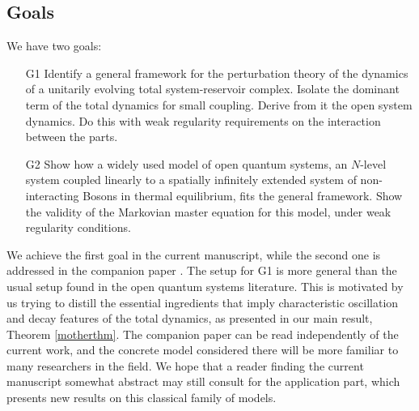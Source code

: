 \documentclass[letterpaper,onecolumn,11pt,accepted=2021-12-09]{quantumarticle}
\numberwithin{equation}{section}
\begin{document}
\subsection{Goals}


We have two goals:
\begin{itemize}
	\item[G1] Identify a general framework for the perturbation theory of the dynamics of a unitarily evolving total system-reservoir complex. Isolate the dominant term of the total dynamics for small coupling. Derive from it the open system dynamics. Do this with weak regularity requirements on the interaction between the parts.
	
	
	\item[G2] Show how a widely used model of open quantum systems, an $N$-level system coupled linearly to a spatially infinitely extended system of non-interacting Bosons in thermal equilibrium, fits the general framework. Show the validity of the Markovian master equation for this model, under weak regularity conditions.  
\end{itemize}


We achieve the first goal in the current manuscript, while the second one is addressed in the companion paper \cite{Markov2}. The setup for G1 is more general than the usual setup found in the open quantum systems literature. This is motivated by us trying to distill the essential ingredients that imply characteristic oscillation and decay features of the total dynamics, as presented in our main result, Theorem \ref{motherthm}. The companion paper \cite{Markov2} can be read independently of the current work, and the concrete model considered there will be more familiar to many researchers in the field. We hope that a reader finding the current manuscript somewhat abstract may still consult \cite{Markov2} for the application part, which presents new results on this classical family of models.


\bigskip
\end{document}
